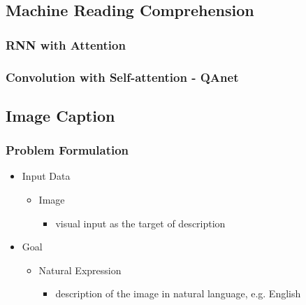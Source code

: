 \subsection{Machine Reading Comprehension}
\subsubsection{RNN with Attention}
\subsubsection{Convolution with Self-attention - QAnet}

\subsection{Image Caption}
\subsubsection{Problem Formulation}
\begin{itemize}
\item Input Data
	\begin{itemize}
	\item Image 
		\begin{itemize}
		\item visual input as the target of description
		\end{itemize}
	\end{itemize}
\item Goal
	\begin{itemize}
	\item Natural Expression
		\begin{itemize}
		\item description of the image in natural language, e.g. English
		\end{itemize}
	\end{itemize}
\end{itemize}

